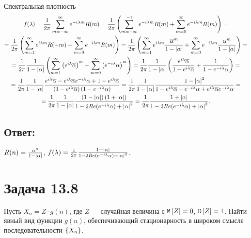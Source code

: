 \documentclass[12pt]{article}
\begin{document}
    Спектральная плотность
    \begin{multline*}
        f(\lambda)
        = \frac{1}{2 \pi} \sum_{m = -\infty}^{\infty} e^{-i \lambda m} R(m)
        = \frac{1}{2 \pi} \left ( \sum_{m = -\infty}^{-1} e^{-i \lambda m} R(m) + \sum_{m = 0}^{\infty} e^{-i \lambda m} R(m) \right ) = \\
        = \frac{1}{2 \pi} \left ( \sum_{m = 1}^{\infty} e^{i \lambda m} R(-m) + \sum_{m = 0}^{\infty} e^{-i \lambda m} R(m) \right )
        = \frac{1}{2 \pi} \left ( \sum_{m = 1}^{\infty} e^{i \lambda m} \frac{\overline{\alpha}^m}{1 - \left | \alpha \right |} + \sum_{m = 0}^{\infty} e^{-i \lambda m} \frac{\alpha^m}{1 - \left | \alpha \right |} \right ) = \\
        = \frac{1}{2 \pi} \frac{1}{1 - \left | \alpha \right |} \left ( \sum_{m = 1}^{\infty} \left ( e^{i \lambda} \overline{\alpha} \right )^m + \sum_{m = 0}^{\infty} \left ( e^{- i \lambda} \alpha \right )^m \right )
        = \frac{1}{2 \pi} \frac{1}{1 - \left | \alpha \right |} \left ( \frac{e^{i \lambda} \overline{\alpha}}{1 - e^{i \lambda} \overline{\alpha}} + \frac{1}{1 - e^{- i \lambda} \alpha} \right ) = \\
        = \frac{1}{2 \pi} \frac{1}{1 - \left | \alpha \right |} \frac{e^{i \lambda} \overline{\alpha} - e^{i \lambda} \overline{\alpha} e^{- i \lambda} \alpha + 1 - e^{i \lambda} \overline{\alpha}}{\left ( 1 - e^{i \lambda} \overline{\alpha} \right ) \left ( 1 - e^{- i \lambda} \alpha \right )}
        = \frac{1}{2 \pi} \frac{1}{1 - \left | \alpha \right |} \frac{1 - \left | \alpha \right |^2}{1 - e^{i \lambda} \overline{\alpha} - e^{- i \lambda} \alpha + e^{i \lambda} \overline{\alpha} e^{- i \lambda} \alpha } = \\
        = \frac{1}{2 \pi} \frac{1}{1 - \left | \alpha \right |} \frac{\left ( 1 - \left | \alpha \right | \right ) \left ( 1 + \left | \alpha \right | \right )}{1 - 2 Re ( e^{-i \lambda} \alpha ) + \left | \alpha \right |^2}
        = \frac{1}{2 \pi} \frac{1 + \left | \alpha \right |}{1 - 2 Re ( e^{-i \lambda} \alpha ) + \left | \alpha \right |^2} .
    \end{multline*}

    \subsection*{Ответ:}
    $R(n) = \frac{\alpha^n}{1 - \left | \alpha \right |}$,
    $f(\lambda) = \frac{1}{2 \pi} \frac{1 + \left | \alpha \right |}{1 - 2 Re ( e^{-i \lambda} \alpha ) + \left | \alpha \right |^2}$.

    \section*{Задача 13.8}
    Пусть $X_n = Z \cdot g(n)$, где $Z$ --- случайная величина с $\mathtt{M} \left [ Z \right ] = 0$, $\mathtt{D} \left [ Z \right ] = 1$. Найти явный вид функции $g(n)$, обеспечивающий стационарность в широком смысле
    последовательности $\left \{ X_n \right \}$.
\end{document}
